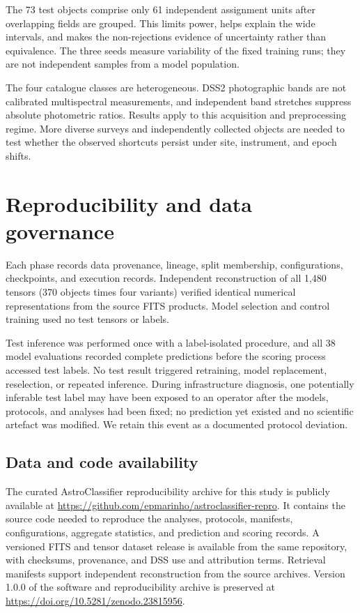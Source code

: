 \documentclass[preprint,12pt,authoryear]{elsarticle}
\begin{document}
The 73 test objects comprise only 61 independent assignment units after overlapping
fields are grouped. This limits power, helps explain the wide intervals, and makes
the non-rejections evidence of uncertainty rather than equivalence. The three seeds
measure variability of the fixed training runs; they are not independent samples
from a model population.

The four catalogue classes are heterogeneous. DSS2 photographic bands are not
calibrated multispectral measurements, and independent band stretches suppress
absolute photometric ratios. Results apply to this acquisition and preprocessing
regime. More diverse surveys and independently collected objects are needed to test
whether the observed shortcuts persist under site, instrument, and epoch shifts.

\section{Reproducibility and data governance}

Each phase records data provenance, lineage, split membership, configurations,
checkpoints, and execution records. Independent reconstruction of all 1,480 tensors
(370 objects times four variants) verified identical numerical representations from
the source FITS products. Model selection and control training used no test tensors
or labels.

Test inference was performed once with a label-isolated procedure, and all 38 model
evaluations recorded complete predictions before the scoring process accessed test
labels. No test result triggered retraining, model replacement, reselection, or
repeated inference. During infrastructure diagnosis, one potentially inferable test
label may have been exposed to an operator after the models, protocols, and analyses
had been fixed; no prediction yet existed and no scientific artefact was modified.
We retain this event as a documented protocol deviation.

\subsection*{Data and code availability}

The curated AstroClassifier reproducibility archive for this study is publicly
available at \url{https://github.com/epmarinho/astroclassifier-repro}. It contains
the source code needed to reproduce the analyses, protocols, manifests,
configurations, aggregate statistics, and prediction and scoring records. A
versioned FITS and tensor dataset release is available from the same repository,
with checksums, provenance, and DSS use and attribution terms. Retrieval manifests
support independent reconstruction from the source archives. Version 1.0.0 of the
software and reproducibility archive is preserved at
\url{https://doi.org/10.5281/zenodo.23815956}.
\end{document}
